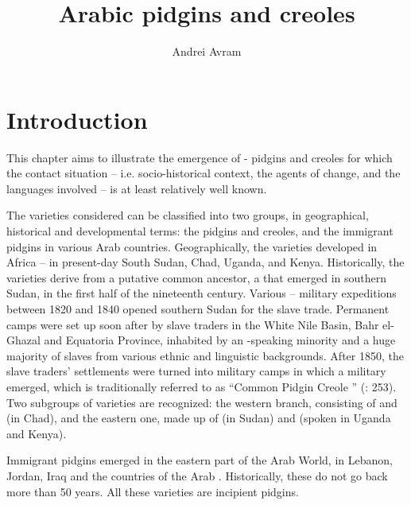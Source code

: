 \documentclass[output=paper]{langsci/langscibook}
\author{Andrei Avram\affiliation{University of Bucharest}}
\title{Arabic pidgins and creoles}
\begin{document}
\maketitle 


\section{Introduction}

This chapter aims to illustrate the emergence of - pidgins and creoles for which the contact situation – i.e. socio-historical context, the agents of change, and the languages involved – is at least relatively well known.

  The varieties considered can be classified into two groups, in geographical, historical and developmental terms: the  pidgins and creoles, and the immigrant pidgins in various Arab countries. Geographically, the  varieties developed in Africa – in present-day South Sudan, Chad, Uganda, and Kenya. Historically, the  varieties derive from a putative common ancestor, a  that emerged in southern Sudan, in the first half of the nineteenth century. Various -- military expeditions between 1820 and 1840 opened southern Sudan for the slave trade. Permanent camps were set up soon after by slave traders in the White Nile Basin, Bahr el-Ghazal and Equatoria Province, inhabited by an -speaking minority and a huge majority of slaves from various ethnic and linguistic backgrounds. After 1850, the slave traders’ settlements were turned into military camps in which a military  emerged, which is traditionally referred to as “Common  Pidgin Creole ” (\citealt{ToscoManfredi2013}: 253). Two subgroups of  varieties are recognized: the western branch, consisting of  and   (in Chad), and the eastern one, made up of   (in Sudan) and  (spoken in Uganda and Kenya). 

  Immigrant pidgins emerged in the eastern part of the Arab World, in Lebanon, Jordan, Iraq and the countries of the Arab . Historically, these do not go back more than 50 years. All these varieties are incipient pidgins.
\end{document}
